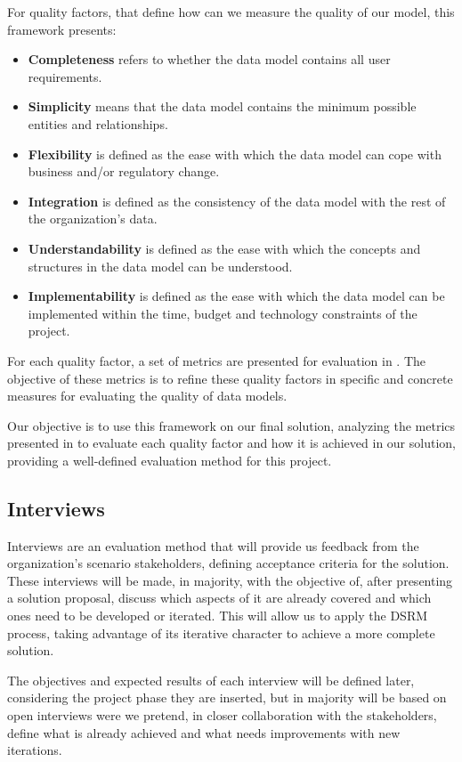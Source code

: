 For quality factors, that define how can we measure the quality of our model, this framework presents:

\begin{itemize}
\item \textbf{Completeness} refers to whether the data model contains all user requirements.
\item \textbf{Simplicity} means that the data model contains the minimum possible entities and relationships.
\item \textbf{Flexibility} is defined as the ease with which the data model can cope with business and/or regulatory change.
\item \textbf{Integration} is defined as the consistency of the data model with the rest of the organization's data.
\item \textbf{Understandability} is defined as the ease with which the concepts and structures in the data model can be understood.
\item \textbf{Implementability} is defined as the ease with which the data model can be implemented within the time, budget and technology constraints of the project.
\end{itemize}

For each quality factor, a set of metrics are presented for evaluation in \cite{moody1998metrics}. The objective of these metrics is to refine these quality factors in specific and concrete measures for evaluating the quality of data models.\par
Our objective is to use this framework on our final solution, analyzing the metrics presented in \cite{moody1998metrics} to evaluate each quality factor and how it is achieved in our solution, providing a well-defined evaluation method for this project.\par

\subsection{Interviews}

Interviews are an evaluation method that will provide us feedback from the organization's scenario stakeholders, defining acceptance criteria for the solution. These interviews will be made, in majority, with the objective of, after presenting a solution proposal, discuss which aspects of it are already covered and which ones need to be developed or iterated. This will allow us to apply the DSRM process, taking advantage of its iterative character to achieve a more complete solution.\par
The objectives and expected results of each interview will be defined later, considering the project phase they are inserted, but in majority will be based on open interviews were we pretend, in closer collaboration with the stakeholders, define what is already achieved and what needs improvements with new iterations.\par  

